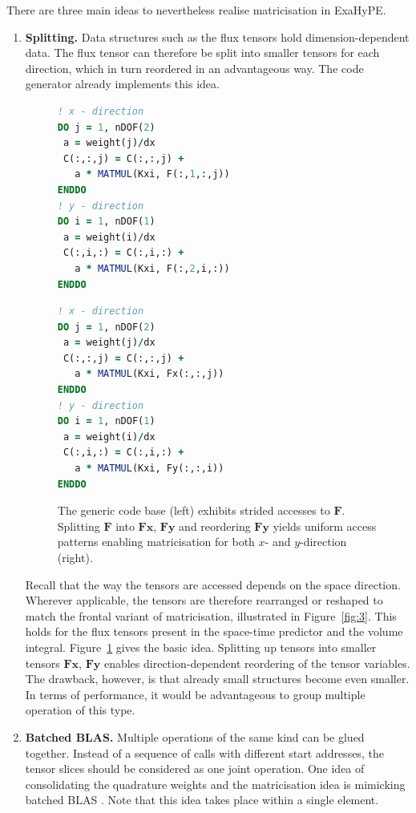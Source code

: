 \documentclass{acm_proc_article-sp}
\begin{document}
There are three main ideas to nevertheless realise matricisation in ExaHyPE.
\begin{enumerate}
\item \textbf{Splitting.} Data structures such as the flux tensors hold dimension-dependent data. The flux tensor can therefore be split into smaller tensors for each direction, which in turn reordered in an advantageous way. The code generator already implements this idea.
\begin{figure}
\begin{minipage}[t]{0.45\linewidth}
\begin{lstlisting}[language=fortran]
! x - direction 
DO j = 1, nDOF(2) 
 a = weight(j)/dx
 C(:,:,j) = C(:,:,j) + 
   a * MATMUL(Kxi, F(:,1,:,j))
ENDDO
! y - direction
DO i = 1, nDOF(1) 
 a = weight(i)/dx
 C(:,i,:) = C(:,i,:) + 
   a * MATMUL(Kxi, F(:,2,i,:))
ENDDO
\end{lstlisting}
\end{minipage}%
\hfill\vrule\hfill
\begin{minipage}[t]{0.45\linewidth}
\begin{lstlisting}[language=fortran]
! x - direction 
DO j = 1, nDOF(2) 
 a = weight(j)/dx
 C(:,:,j) = C(:,:,j) + 
   a * MATMUL(Kxi, Fx(:,:,j))
ENDDO
! y - direction
DO i = 1, nDOF(1) 
 a = weight(i)/dx
 C(:,i,:) = C(:,i,:) + 
   a * MATMUL(Kxi, Fy(:,:,i))
ENDDO
\end{lstlisting}
\end{minipage}
\caption{The generic code base (left) exhibits strided accesses to $\mathbf{F}$. Splitting $\mathbf{F}$ into $\mathbf{Fx}$, $\mathbf{Fy}$ and reordering $\mathbf{Fy}$ yields uniform access patterns enabling matricisation for both $x$- and $y$-direction (right).}\label{fig:code}
\end{figure}

Recall that the way the tensors are accessed depends on the space direction. Wherever applicable, the tensors are therefore rearranged or reshaped to match the frontal variant of matricisation, illustrated in Figure~\ref{fig:3}. This holds for the flux tensors present in the space-time predictor and the volume integral. Figure~\ref{fig:code} gives the basic idea. Splitting up tensors into smaller tensors $\mathbf{Fx}$, $\mathbf{Fy}$ enables direction-dependent reordering of the tensor variables. The drawback, however, is that already small structures become even smaller. In terms of performance, it would be advantageous to group multiple operation of this type.
\item \textbf{Batched BLAS.} Multiple operations of the same kind can be glued together. Instead of a sequence of calls with different start addresses, the tensor slices should be considered as one joint operation. One idea of consolidating the quadrature weights and the matricisation idea is mimicking batched BLAS \cite{dongarra2016proposed}. Note that this idea takes place within a single element.


\end{enumerate}
\end{document}
